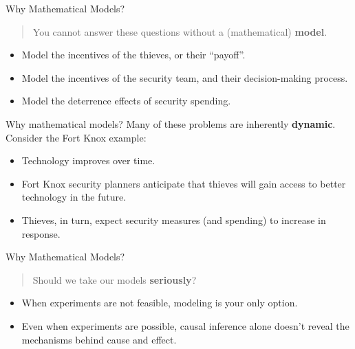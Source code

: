 \documentclass[aspectratio=169,10pt]{beamer}
\newcommand{\emphcolor}[1]{\textbf{\textcolor{emphcolorval}{#1}}}
\begin{document}
\begin{frame}{Why Mathematical Models?}
	\begin{quote}
		You cannot answer these questions without a (mathematical) \emphcolor{model}.	
	\end{quote}
	
	\begin{itemize}
		\item Model the incentives of the thieves, or their “payoff”.
		\vspace{0.025in}
		\item Model the incentives of the security team, and their decision-making process.
		\vspace{0.025in}
		\item Model the deterrence effects of security spending.
	\end{itemize}
\end{frame}

\begin{frame}{Why mathematical models?}
	Many of these problems are inherently \emphcolor{dynamic}. Consider the Fort Knox example:
	\begin{itemize}
		\item Technology improves over time.
		\vspace{0.025in}
		\item Fort Knox security planners anticipate that thieves will gain access to better technology in the future.
		\vspace{0.025in}
		\item Thieves, in turn, expect security measures (and spending) to increase in response.
	\end{itemize}
\end{frame}

\begin{frame}{Why Mathematical Models?}
	\begin{quote}
		Should we take our models \emphcolor{seriously}?
	\end{quote}
	\begin{itemize}
		\item When experiments are not feasible, modeling is your only option.
		\vspace{0.025in}
		\item Even when experiments are possible, causal inference alone doesn't reveal the mechanisms behind cause and effect.
	\end{itemize}
\end{frame}
\end{document}
